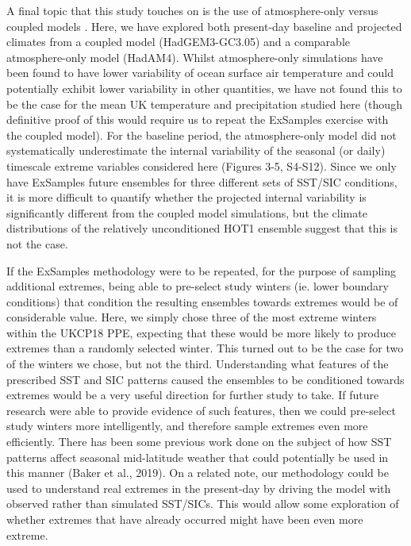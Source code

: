   A final topic that this study touches on is the use of atmosphere-only versus coupled models \citep{barsugli_basic_1998,dong_attribution_2017,fischer_biased_2018,he_does_2016}. Here, we have explored both present-day baseline and projected climates from a coupled model (HadGEM3-GC3.05) and a comparable atmosphere-only model (HadAM4). Whilst atmosphere-only simulations have been found to have lower variability of ocean surface air temperature \citep{barsugli_basic_1998} and could potentially exhibit lower variability in other quantities, we have not found this to be the case for the mean UK temperature and precipitation studied here (though definitive proof of this would require us to repeat the ExSamples exercise with the coupled model). For the baseline period, the atmosphere-only model did not systematically underestimate the internal variability of the seasonal (or daily) timescale extreme variables considered here (Figures 3-5, S4-S12). Since we only have ExSamples future ensembles for three different sets of SST/SIC conditions, it is more difficult to quantify whether the projected internal variability is significantly different from the coupled model simulations, but the climate distributions of the relatively unconditioned HOT1 ensemble suggest that this is not the case.
  
  If the ExSamples methodology were to be repeated, for the purpose of sampling additional extremes, being able to pre-select study winters (ie. lower boundary conditions) that condition the resulting ensembles towards extremes would be of considerable value. Here, we simply chose three of the most extreme winters within the UKCP18 PPE, expecting that these would be more likely to produce extremes than a randomly selected winter. This turned out to be the case for two of the winters we chose, but not the third. Understanding what features of the prescribed SST and SIC patterns caused the ensembles to be conditioned towards extremes would be a very useful direction for further study to take. If future research were able to provide evidence of such features, then we could pre-select study winters more intelligently, and therefore sample extremes even more efficiently. There has been some previous work done on the subject of how SST patterns affect seasonal mid-latitude weather that could potentially be used in this manner (Baker et al., 2019). On a related note, our methodology could be used to understand real extremes in the present-day by driving the model with observed rather than simulated SST/SICs. This would allow some exploration of whether extremes that have already occurred might have been even more extreme.
  
